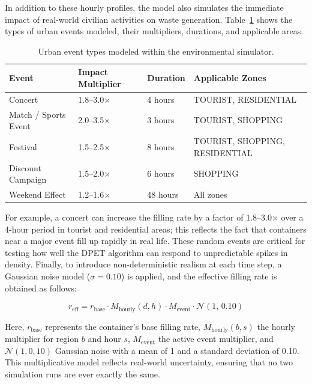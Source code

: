 \documentclass[12pt,a4paper]{report}
\begin{document}
\indent In addition to these hourly profiles, the model also simulates the immediate impact of real-world civilian activities on waste generation. Table~\ref{tab:events} shows the types of urban events modeled, their multipliers, durations, and applicable areas.

\begin{table}[H]
\centering
\caption{Urban event types modeled within the environmental simulator.}
\label{tab:events}
\begin{tabular}{llll}
\toprule
\textbf{Event} & \textbf{Impact Multiplier} & \textbf{Duration} & \textbf{Applicable Zones} \\
\midrule
Concert   & 1.8--3.0$\times$ & 4 hours   & TOURIST, RESIDENTIAL \\
Match / Sports Event & 2.0--3.5$\times$ & 3 hours   & TOURIST, SHOPPING \\
Festival & 1.5--2.5$\times$ & 8 hours   & TOURIST, SHOPPING, RESIDENTIAL \\
Discount Campaign & 1.5--2.0$\times$ & 6 hours   & SHOPPING \\
Weekend Effect & 1.2--1.6$\times$ & 48 hours & All zones \\
\bottomrule
\end{tabular}
\end{table}

\indent For example, a concert can increase the filling rate by a factor of 1.8–3.0$\times$ over a 4-hour period in tourist and residential areas; this reflects the fact that containers near a major event fill up rapidly in real life. These random events are critical for testing how well the DPET algorithm can respond to unpredictable spikes in density. Finally, to introduce non-deterministic realism at each time step, a Gaussian noise model ($\sigma = 0.10$) is applied, and the effective filling rate is obtained as follows:

\begin{equation}
  r_{\text{eff}} = r_{\text{base}} \cdot M_{\text{hourly}}(d,h) \cdot M_{\text{event}} \cdot \mathcal{N}(1,\,0.10)
  \label{eq:eff_rate}
\end{equation}


\indent Here, $r_{\text{base}}$ represents the container’s base filling rate, $M_{\text{hourly}}(b,s)$ the hourly multiplier for region $b$ and hour $s$, $M_{\text{event}}$ the active event multiplier, and $\mathcal{N}(1,0, 10)$ Gaussian noise with a mean of 1 and a standard deviation of 0.10. This multiplicative model reflects real-world uncertainty, ensuring that no two simulation runs are ever exactly the same.
\end{document}
